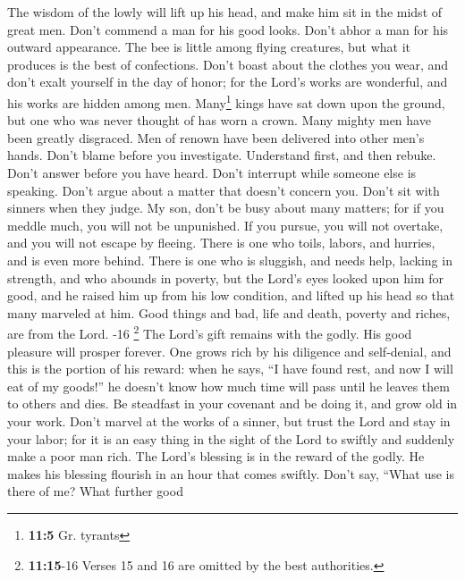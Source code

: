  The wisdom of the lowly will lift up his head, and make
him sit in the midst of great men.  Don't commend a man
for his good looks. Don't abhor a man for his outward appearance.
 The bee is little among flying creatures, but what it
produces is the best of confections.  Don't boast about
the clothes you wear, and don't exalt yourself in the day of honor; for
the Lord's works are wonderful, and his works are hidden among men.
 Many\footnote{\textbf{11:5} Gr. tyrants} kings have sat
down upon the ground, but one who was never thought of has worn a crown.
 Many mighty men have been greatly disgraced. Men of
renown have been delivered into other men's hands.  Don't
blame before you investigate. Understand first, and then rebuke.
 Don't answer before you have heard. Don't interrupt while
someone else is speaking.  Don't argue about a matter that
doesn't concern you. Don't sit with sinners when they judge.
 My son, don't be busy about many matters; for if you
meddle much, you will not be unpunished. If you pursue, you will not
overtake, and you will not escape by fleeing.  There is
one who toils, labors, and hurries, and is even more behind.
 There is one who is sluggish, and needs help, lacking in
strength, and who abounds in poverty, but the Lord's eyes looked upon
him for good, and he raised him up from his low condition,
 and lifted up his head so that many marveled at him.
 Good things and bad, life and death, poverty and riches,
are from the Lord. -16 \footnote{\textbf{11:15}-16 Verses
  15 and 16 are omitted by the best authorities.}  The
Lord's gift remains with the godly. His good pleasure will prosper
forever.  One grows rich by his diligence and
self-denial, and this is the portion of his reward:  when
he says, ``I have found rest, and now I will eat of my goods!'' he
doesn't know how much time will pass until he leaves them to others and
dies.  Be steadfast in your covenant and be doing it, and
grow old in your work.  Don't marvel at the works of a
sinner, but trust the Lord and stay in your labor; for it is an easy
thing in the sight of the Lord to swiftly and suddenly make a poor man
rich.  The Lord's blessing is in the reward of the godly.
He makes his blessing flourish in an hour that comes swiftly.
 Don't say, ``What use is there of me? What further good
